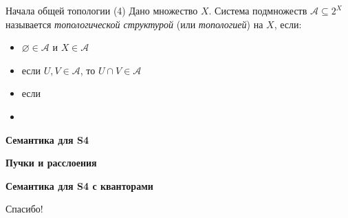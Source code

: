 \documentclass{beamer}
\begin{document}
\begin{frame}{Начала общей топологии (4)}
Дано множество $X$. Система подмножеств $\mathcal{A} \subseteq 2^X$ называется \textit{топологической структурой} (или \textit{топологией}) на $X$, если:\\
\bigskip
\begin{itemize}
	\item $\varnothing \in \mathcal{A}$ и $X \in \mathcal{A}$
	\item если $U, V \in \mathcal{A}$, то $U \cap V \in \mathcal{A}$
	\item если 
	\item 
\end{itemize}
\end{frame}


\begin{frame}{}
\begin{center}
	\textbf{Семантика для S4}
\end{center}
\end{frame}

\begin{frame}{}
\begin{center}
	\textbf{Пучки и расслоения}
\end{center}
\end{frame}

\begin{frame}{}
\begin{center}
	\textbf{Семантика для S4 с кванторами}
\end{center}
\end{frame}






\begin{frame}{}
    \thispagestyle{empty}
    \begin{center}
        {\large Спасибо!}
    \end{center}
\end{frame}


\end{document}
